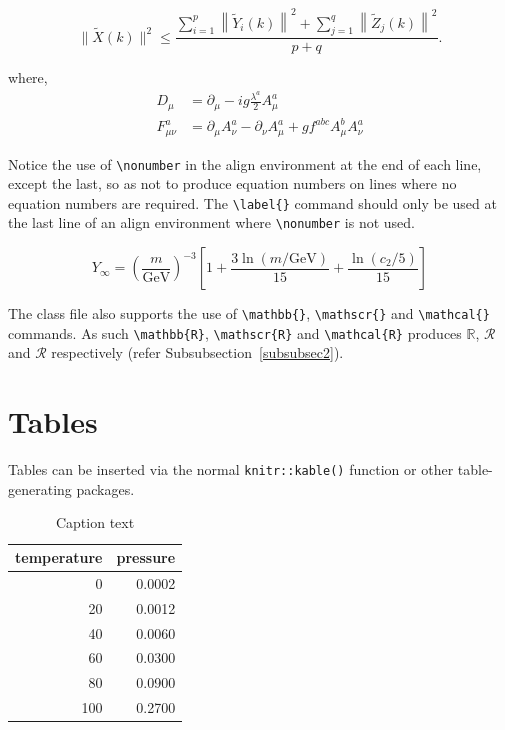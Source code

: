 \documentclass[sn-vancouver,Numbered,pdflatex]{sn-jnl}
\theoremstyle{remark}
\theoremstyle{definition}
\begin{document}
\begin{equation}
\|\tilde{X}(k)\|^2 \leq\frac{\sum\limits_{i=1}^{p}\left\|\tilde{Y}_i(k)\right\|^2+\sum\limits_{j=1}^{q}\left\|\tilde{Z}_j(k)\right\|^2 }{p+q}.\label{eq1}
\end{equation}

where, \begin{align}
D_\mu &=  \partial_\mu - ig \frac{\lambda^a}{2} A^a_\mu \nonumber \\
F^a_{\mu\nu} &= \partial_\mu A^a_\nu - \partial_\nu A^a_\mu + g f^{abc} A^b_\mu A^a_\nu \label{eq2}
\end{align}

Notice the use of \texttt{\textbackslash{}nonumber} in the align
environment at the end of each line, except the last, so as not to
produce equation numbers on lines where no equation numbers are
required. The \texttt{\textbackslash{}label\{\}} command should only be
used at the last line of an align environment where
\texttt{\textbackslash{}nonumber} is not used.

\begin{equation}
Y_\infty = \left( \frac{m}{\textrm{GeV}} \right)^{-3}
    \left[ 1 + \frac{3 \ln(m/\textrm{GeV})}{15}
    + \frac{\ln(c_2/5)}{15} \right]
\end{equation}

The class file also supports the use of
\texttt{\textbackslash{}mathbb\{\}},
\texttt{\textbackslash{}mathscr\{\}} and
\texttt{\textbackslash{}mathcal\{\}} commands. As such
\texttt{\textbackslash{}mathbb\{R\}},
\texttt{\textbackslash{}mathscr\{R\}} and
\texttt{\textbackslash{}mathcal\{R\}} produces \(\mathbb{R}\),
\(\mathscr{R}\) and \(\mathcal{R}\) respectively (refer
Subsubsection~\ref{subsubsec2}).

\hypertarget{sec5}{%
\section{Tables}\label{sec5}}

Tables can be inserted via the normal \texttt{knitr::kable()} function
or other table-generating packages.

\begin{table}

\caption{\label{tab:tab1}Caption text}
\centering
\begin{tabular}[t]{r|r}
\hline
temperature & pressure\\
\hline
0 & 0.0002\\
\hline
20 & 0.0012\\
\hline
40 & 0.0060\\
\hline
60 & 0.0300\\
\hline
80 & 0.0900\\
\hline
100 & 0.2700\\
\hline
\end{tabular}
\end{table}
\end{document}
